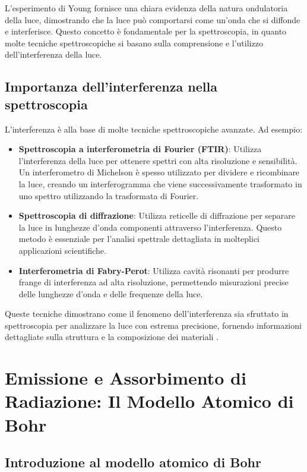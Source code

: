 \documentclass[12pt,a4paper]{report}
\begin{document}
L'esperimento di Young fornisce una chiara evidenza della natura ondulatoria della luce, dimostrando che la luce può comportarsi come un'onda che si diffonde e interferisce. Questo concetto è fondamentale per la spettroscopia, in quanto molte tecniche spettroscopiche si basano sulla comprensione e l'utilizzo dell'interferenza della luce.

\subsection{Importanza dell'interferenza nella spettroscopia}

L'interferenza è alla base di molte tecniche spettroscopiche avanzate. Ad esempio:

\begin{itemize}
\item \textbf{Spettroscopia a interferometria di Fourier (FTIR)}: Utilizza l'interferenza della luce per ottenere spettri con alta risoluzione e sensibilità. Un interferometro di Michelson è spesso utilizzato per dividere e ricombinare la luce, creando un interferogramma che viene successivamente trasformato in uno spettro utilizzando la trasformata di Fourier.
\item \textbf{Spettroscopia di diffrazione}: Utilizza reticelle di diffrazione per separare la luce in lunghezze d'onda componenti attraverso l'interferenza. Questo metodo è essenziale per l'analisi spettrale dettagliata in molteplici applicazioni scientifiche.
\item \textbf{Interferometria di Fabry-Perot}: Utilizza cavità risonanti per produrre frange di interferenza ad alta risoluzione, permettendo misurazioni precise delle lunghezze d'onda e delle frequenze della luce.
\end{itemize}

Queste tecniche dimostrano come il fenomeno dell'interferenza sia sfruttato in spettroscopia per analizzare la luce con estrema precisione, fornendo informazioni dettagliate sulla struttura e la composizione dei materiali \cite{born1999principles}.

\section{Emissione e Assorbimento di Radiazione: Il Modello Atomico di Bohr}

\subsection{Introduzione al modello atomico di Bohr}
\end{document}
